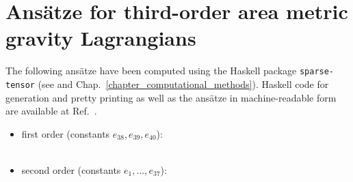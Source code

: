 \chapter{Ansätze for third-order area metric gravity Lagrangians}
\label{appendix_ansaetze}

The following ansätze have been computed using the Haskell package \texttt{sparse-tensor} (see \cite{Reinhart_2019_sparse-tensor} and Chap.~\ref{chapter_computational_methods}). Haskell code for generation and pretty printing as well as the ansätze in machine-readable form are available at Ref.\ \cite{Alex_2020_area-metric-gravity}.

\begin{itemize}
  \item first order (constants $e_{38},e_{39},e_{40}$): \vspace{-2ex}\\
   \\
\item second order (constants $e_{1},\dots,e_{37}$): \vspace{-2ex}\\
\end{itemize}
